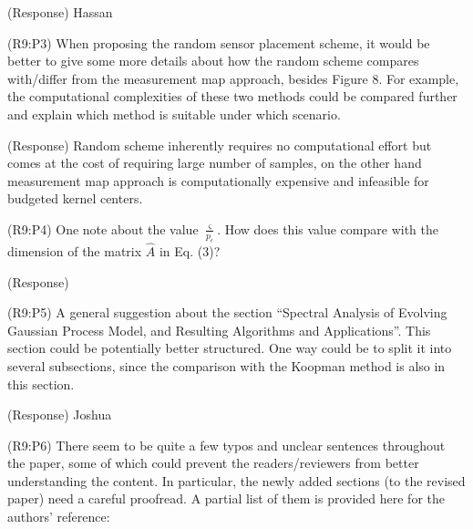 \documentclass{letter}
\begin{document}
{\color{red}(Response)} Hassan

{\color{red}(R9:P3)} When proposing the random sensor placement scheme, it would be better to give some more details about how the random scheme compares with/differ from the measurement map approach, besides Figure 8. For example, the computational complexities of these two methods could be compared further and explain which method is suitable under which scenario.

{\color{red}(Response)}  Random scheme inherently requires no computational effort but comes at the cost of requiring large number of samples, on the other hand measurement map approach is computationally expensive and infeasible for budgeted kernel centers. 

{\color{red}(R9:P4)} One note about the value $\frac{\varsigma}{p_{\epsilon}}$. How does this value compare with the dimension of the matrix $\hat{A}$ in Eq. (3)?

{\color{red}(Response)} 

{\color{red}(R9:P5)} A general suggestion about the section “Spectral Analysis of Evolving Gaussian Process Model, and Resulting Algorithms and Applications”. This section could be potentially better structured. One way could be to split it into several subsections, since the comparison with the Koopman method is also in this section.

{\color{red}(Response)} Joshua

{\color{red}(R9:P6)} There seem to be quite a few typos and unclear sentences throughout the paper, some of which could prevent the readers/reviewers from better
understanding the content. In particular, the newly added sections (to the revised paper) need a careful proofread. A partial list of them is
provided here for the authors’ reference: 
\end{document}
